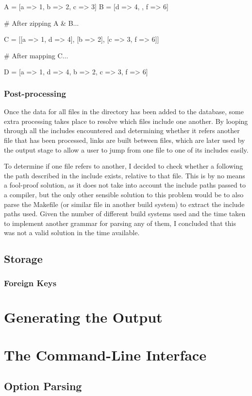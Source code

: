     \begin{code}[language=ruby, gobble=6]
      A = [{a => 1}, {b => 2}, {c => 3}]
      B = [{d => 4}, {}, {f => 6}]

      # After zipping A & B...

      C = [[{a => 1}, {d => 4}], [{b => 2}], [{c => 3}, {f => 6}]]

      # After mapping C...

      D = [{a => 1, d => 4}, {b => 2}, {c => 3, f => 6}]
    \end{code}

      \subsubsection{Post-processing}
        Once the data for all files in the directory has been added to the
        database, some extra processing takes place to resolve which files
        include one another. By looping through all the includes encountered
        and determining whether it refers another file that has been processed,
        links are built between files, which are later used by the output stage
        to allow a user to jump from one file to one of its includes easily.

        To determine if one file refers to another, I decided to check whether a
        following the path described in the include exists, relative to that
        file. This is by no means a fool-proof solution, as it does not take
        into account the include paths passed to a compiler, but the only other
        sensible solution to this problem would be to also parse the Makefile
        (or similar file in another build system) to extract the include paths
        used. Given the number of different build systems used and the time
        taken to implement another grammar for parsing any of them, I concluded
        that this was not a valid solution in the time available.

  \subsection{Storage}

    \subsubsection{Foreign Keys}

\section{Generating the Output}

\section{The Command-Line Interface}

  \subsection{Option Parsing}
